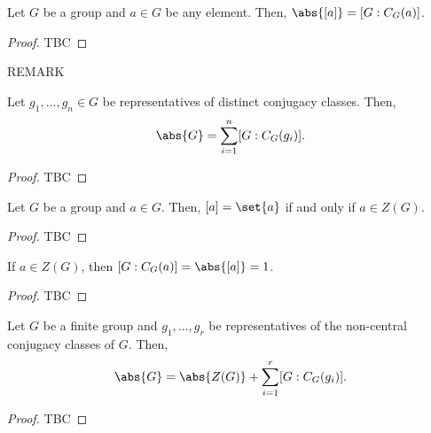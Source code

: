 \documentclass[11pt]{penrose}
\begin{document}
\begin{nthm}
    Let $G$ be a group and $a \in G$ be any element. Then, $\abs{[a]} = [G : C_{G}(a)]$.
\end{nthm}
\begin{proof}
    TBC
\end{proof}

REMARK

\begin{nthm}
    Let $g_{1}, \dots, g_{n} \in G$ be representatives of distinct conjugacy classes. Then,
    \begin{equation*}
        \abs{G} = \sum_{i=1}^{n} [G : C_{G}(g_{i})].
    \end{equation*}
\end{nthm}
\begin{proof}
    TBC
\end{proof}

\begin{nlemma}
    Let $G$ be a group and $a \in G$. Then, $[a] = \set{a}$ if and only if $a \in Z(G)$.
\end{nlemma}
\begin{proof}
    TBC
\end{proof}

\begin{ncor}
    If $a \in Z(G)$, then $[G : C_{G}(a)] = \abs{ [a] } = 1$.
\end{ncor}
\begin{proof}
    TBC
\end{proof}

\begin{nthm}
    Let $G$ be a finite group and $g_{1}, \dots, g_{r}$ be representatives of the non-central conjugacy classes of $G$. Then,
    \begin{equation*}
        \abs{G} = \abs{Z(G)} + \sum_{i=1}^{r} [G : C_{G}(g_{i})].
    \end{equation*}
\end{nthm}
\begin{proof}
    TBC
\end{proof}
\end{document}
